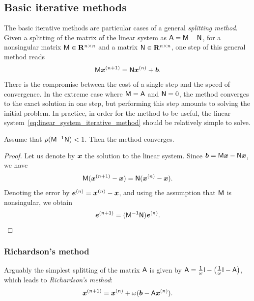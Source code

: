 \subsection{Basic iterative methods}%
\label{sub:basic_iterative_methods}
The basic iterative methods are particular cases of a general \emph{splitting method}.
Given a splitting of the matrix of the linear system as $\mathsf A = \mathsf M - \mathsf N$,
for a nonsingular matrix $\mathsf M \in \mathbf R^{n \times n}$ and a matrix $\mathsf N \in  \mathbf R^{n \times n}$,
one step of this general method reads
\begin{equation}
    \label{eq:linear_system_iterative_method}
    \mathsf M \mathbf{\boldsymbol{x}}^{(n+1)} = \mathsf N \mathbf{\boldsymbol{x}}^{(n)} + \mathbf{\boldsymbol{b}}.
\end{equation}
There is the compromise between the cost of a single step and the speed of convergence.
In the extreme case where $\mathsf M = \mathsf A$ and $\mathsf N = 0$,
the method converges to the exact solution in one step,
but performing this step amounts to solving the initial problem.
In practice, in order for the method to be useful,
the linear system~\eqref{eq:linear_system_iterative_method} should be relatively simple to solve.


\begin{proposition}
    [Convergence]
    Assume that $\rho(\mathsf M^{-1} \mathsf N) < 1$.
    Then the method converges.
\end{proposition}
\begin{proof}
    Let us denote by $\mathbf{\boldsymbol{x}}$ the solution to the linear system.
    Since $\mathbf{\boldsymbol{b}} = \mathsf M \mathbf{\boldsymbol{x}} - \mathsf N \mathbf{\boldsymbol{x}}$,
    we have
    \[
        \mathsf M (\mathbf{\boldsymbol{x}}^{(n+1)} - \mathbf{\boldsymbol{x}}) = \mathsf N (\mathbf{\boldsymbol{x}}^{(n)} - \mathbf{\boldsymbol{x}}).
    \]
    Denoting the error by $\mathbf{\boldsymbol{e}}^{(n)} = \mathbf{\boldsymbol{x}}^{(n)} - \mathbf{\boldsymbol{x}}$,
    and using the assumption that $\mathsf M$ is nonsingular,
    we obtain
    \[
        \mathbf{\boldsymbol{e}}^{(n+1)} = (\mathsf M^{-1} \mathsf N) \mathbf{\boldsymbol{e}}^{(n)}.
    \]
\end{proof}

\subsubsection{Richardson's method}%
\label{ssub:richardson_s_method}

Arguably the simplest splitting of the matrix $\mathsf A$ is given by $\mathsf A = \frac{1}{\omega} \mathsf I - \bigl(\frac{1}{\omega} \mathsf I - \mathsf A\bigr)$,
which leads to \emph{Richardson's method}:
\begin{equation}
    \mathbf{\boldsymbol{x}}^{(n+1)} = \mathbf{\boldsymbol{x}}^{(n)} +  \omega (\mathbf{\boldsymbol{b}} - \mathsf A \mathbf{\boldsymbol{x}}^{(n)}).
\end{equation}

